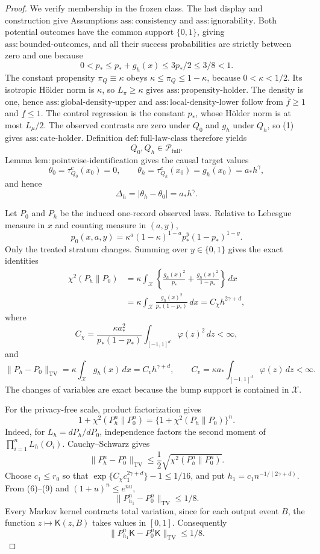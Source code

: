 \documentclass{article}
\begin{document}
\begin{proof}
We verify membership in the frozen class.  The last display and construction give Assumptions \(\mathrm{ass{:}consistency}\) and \(\mathrm{ass{:}ignorability}\).  Both potential outcomes have the common support \(\{0,1\}\), giving \(\mathrm{ass{:}bounded\text{-}outcomes}\), and all their success probabilities are strictly between zero and one because
\[
 0<p_*\le p_*+g_h(x)\le3p_*/2\le3/8<1.
\tag{3}
\]
The constant propensity \(\pi_Q\equiv\kappa\) obeys \(\kappa\le\pi_Q\le1-\kappa\), because \(0<\kappa<1/2\).  Its isotropic H\"older norm is \(\kappa\), so \(L_\pi\ge\kappa\) gives \(\mathrm{ass{:}propensity\text{-}holder}\).  The density is one, hence \(\mathrm{ass{:}global\text{-}density\text{-}upper}\) and \(\mathrm{ass{:}local\text{-}density\text{-}lower}\) follow from \(\overline f\ge1\) and \(\underline f\le1\).  The control regression is the constant \(p_*\), whose H\"older norm is at most \(L_\mu/2\).  The observed contrasts are zero under \(Q_0\) and \(g_h\) under \(Q_h\), so (1) gives \(\mathrm{ass{:}cate\text{-}holder}\).  Definition \(\mathrm{def{:}full\text{-}law\text{-}class}\) therefore yields
\[
 Q_0,Q_h\in\mathcal P_{\mathrm{full}}.
\tag{4}
\]
Lemma \(\mathrm{lem{:}pointwise\text{-}identification}\) gives the causal target values
\[
 \theta_0=\tau_{Q_0}^{\mathrm c}(x_0)=0,
 \qquad
 \theta_h=\tau_{Q_h}^{\mathrm c}(x_0)=g_h(x_0)=a_*h^\gamma,
\]
and hence
\[
 \Delta_h=|\theta_h-\theta_0|=a_*h^\gamma.
\tag{5}
\]

Let \(P_0\) and \(P_h\) be the induced one-record observed laws.  Relative to Lebesgue measure in \(x\) and counting measure in \((a,y)\),
\[
 p_0(x,a,y)=\kappa^a(1-\kappa)^{1-a}p_*^y(1-p_*)^{1-y}.
\]
Only the treated stratum changes.  Summing over \(y\in\{0,1\}\) gives the exact identities
\[
 \begin{aligned}
 \chi^2(P_h\|P_0)
 &=\kappa\int_{\mathcal X}
   \left\{\frac{g_h(x)^2}{p_*}+\frac{g_h(x)^2}{1-p_*}\right\}\,dx\\
 &=\kappa\int_{\mathcal X}\frac{g_h(x)^2}{p_*(1-p_*)}\,dx
 =C_\chi h^{2\gamma+d},
 \end{aligned}
\tag{6}
\]
where
\[
 C_\chi=\frac{\kappa a_*^2}{p_*(1-p_*)}
 \int_{[-1,1]^d}\varphi(z)^2\,dz<\infty,
\]
and
\[
 \|P_h-P_0\|_{\mathrm{TV}}
 =\kappa\int_{\mathcal X}g_h(x)\,dx
 =C_vh^{\gamma+d},
 \qquad
 C_v=\kappa a_*\int_{[-1,1]^d}\varphi(z)\,dz<\infty.
\tag{7}
\]
The changes of variables are exact because the bump support is contained in \(\mathcal X\).

For the privacy-free scale, product factorization gives
\[
 1+\chi^2(P_h^n\|P_0^n)
 =\{1+\chi^2(P_h\|P_0)\}^n.
\tag{8}
\]
Indeed, for \(L_h=dP_h/dP_0\), independence factors the second moment of \(\prod_{i=1}^nL_h(O_i)\).  Cauchy--Schwarz gives
\[
 \|P_h^n-P_0^n\|_{\mathrm{TV}}
 \le\frac12\sqrt{\chi^2(P_h^n\|P_0^n)}.
\tag{9}
\]
Choose \(c_1\le r_0\) so that \(\exp\{C_\chi c_1^{2\gamma+d}\}-1\le1/16\), and put \(h_1=c_1n^{-1/(2\gamma+d)}\).  From (6)--(9) and \((1+u)^n\le e^{nu}\),
\[
 \|P_{h_1}^n-P_0^n\|_{\mathrm{TV}}\le1/8.
\]
Every Markov kernel contracts total variation, since for each output event \(B\), the function \(z\mapsto\mathsf K(z,B)\) takes values in \([0,1]\).  Consequently
\[
 \|P_{h_1}^n\mathsf K-P_0^n\mathsf K\|_{\mathrm{TV}}\le1/8.
\tag{10}
\]


\end{proof}
\end{document}
